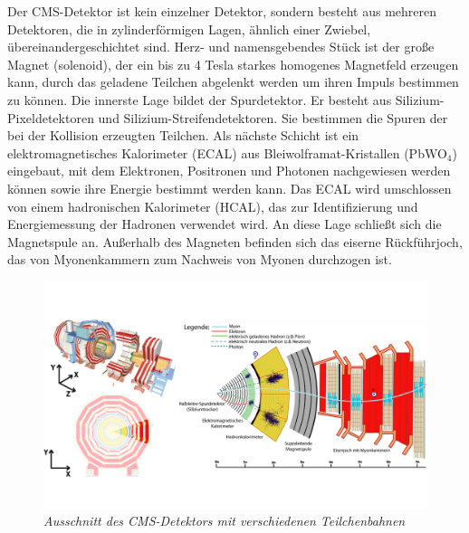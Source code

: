 Der CMS-Detektor ist kein einzelner Detektor, sondern besteht aus mehreren Detektoren, die in zylinderf\"ormigen Lagen, \"ahnlich einer Zwiebel, \"ubereinandergeschichtet sind. Herz- und namensgebendes St\"uck ist der gro\ss e Magnet (solenoid), der ein bis zu \num{4} Tesla starkes homogenes Magnetfeld erzeugen kann, durch das geladene Teilchen abgelenkt werden um ihren Impuls bestimmen zu k\"onnen. Die innerste Lage bildet der Spurdetektor. Er besteht aus Silizium-Pixeldetektoren und Silizium-Streifendetektoren. Sie bestimmen die Spuren der bei der Kollision erzeugten Teilchen. Als n\"achste Schicht ist ein elektromagnetisches Kalorimeter (ECAL) aus Bleiwolframat-Kristallen (PbWO$_4$) eingebaut, mit dem Elektronen, Positronen und Photonen nachgewiesen werden k\"onnen sowie ihre Energie bestimmt werden kann. Das ECAL wird umschlossen von einem hadronischen Kalorimeter (HCAL), das zur Identifizierung und Energiemessung der Hadronen verwendet wird. An diese Lage schlie\ss t sich die Magnetspule an. Au\ss erhalb des Magneten befinden sich das eiserne R\"uckf\"uhrjoch, das von Myonenkammern zum Nachweis von Myonen durchzogen ist.\\

\begin{figure}[hhh]
 \begin{center}
   \includegraphics[width=\textwidth]{graphics/cms_slice.png}
   \parbox[b]{12cm}{
     \caption[CMS-Detektor]
             {\label{fig:cms_slice} \it\!Ausschnitt des CMS-Detektors mit verschiedenen Teilchenbahnen \cite{cms_slice}}
   }
 \end{center}
\end{figure}


